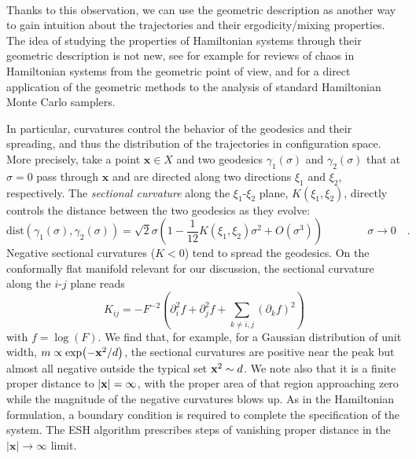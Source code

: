 \documentclass[twoside,11pt]{article}
\newcommand{\x}{\boldsymbol{x}}
\begin{document}
\

Thanks to this observation, we can use the geometric description as another way to gain intuition about the trajectories and their ergodicity/mixing properties.
The idea of studying the properties of Hamiltonian systems through their geometric description is not new, see for example \citet{pettini2007geometry, di2021hamiltonian} for reviews of chaos in Hamiltonian systems from the geometric point of view, and \citet{seiler2014positive} for a direct application of the geometric methods to the analysis of standard Hamiltonian Monte Carlo samplers.



In particular, curvatures control the behavior of the geodesics and their spreading, and thus the distribution of the trajectories in configuration space. More precisely, take a point $\mathbf{x}\in X$ and two geodesics $\gamma_1(\sigma)$ and $\gamma_2(\sigma)$ that at $\sigma = 0$  pass through $\mathbf{x}$ and are directed along two directions $\xi_1$ and $\xi_2$, respectively. The \emph{sectional curvature} along the $\xi_1$-$\xi_2$ plane, $K(\xi_1,\xi_2)$, directly controls the distance between the two geodesics as they evolve:
\begin{equation}
    \text{dist}(\gamma_1(\sigma), \gamma_2(\sigma)) = \sqrt{2}\sigma \left(1-\frac{1}{12}K(\xi_1,\xi_2) \sigma^2+O(\sigma^3)\right)\qquad \qquad \sigma\to 0\quad.
\end{equation}
Negative sectional curvatures ($K<0$) tend to spread the geodesics.
On the conformally flat manifold relevant for our discussion, the sectional curvature along the $i$-$j$ plane reads 
\begin{equation}
    K_{ij} = -F^{-2}\left(\partial_i^2 f + \partial_j^2 f +\sum_{k\ne i,j}(\partial_k f)^2\right)
\end{equation}
with $f=\log(F)$. We find that, for example, for a Gaussian distribution of unit width, $m\propto \exp(-{\bf x}^2/d)$, the sectional curvatures are positive near the peak but almost all negative outside the typical set ${\bf x}^2\sim d$.  We note also that it is a finite proper distance to $|{\bf x}|=\infty$, with the proper area of that region approaching zero while the magnitude of the negative curvatures blows up. As in the Hamiltonian formulation, a boundary condition is required to complete the specification of the system.  The ESH algorithm \citep{ESH} prescribes steps of vanishing proper distance in the $|\x|\to\infty$ limit.
\end{document}
